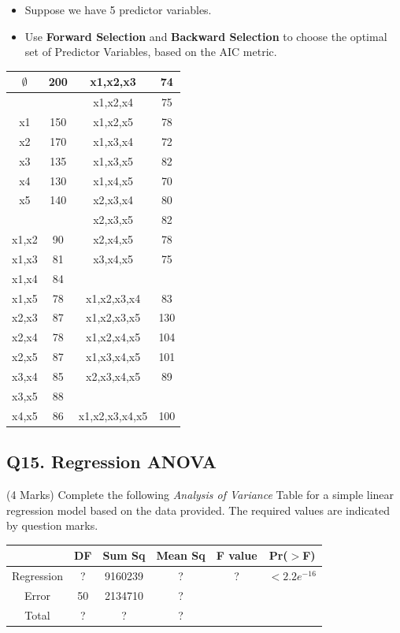 \documentclass[a4paper,12pt]{article}
\begin{document}
\begin{itemize}
\item Suppose we have 5 predictor variables.
\item Use \textbf{Forward Selection} and \textbf{Backward Selection} to choose the optimal set of Predictor Variables, based on the AIC metric.
\end{itemize}
{
	\large
	\begin{center}
\begin{tabular}{|c|c|c|c|}
	\hline
$\emptyset$	&	200	&	x1,x2,x3	&	74	\\ \hline
\phantom{makespace}
 &	\phantom{makespace}
 	&	x1,x2,x4	&	75	\\ \hline
x1	&	150	&	x1,x2,x5	&	78	\\ \hline
x2	&	170	&	x1,x3,x4	&	72	\\ \hline
x3	&	135	&	x1,x3,x5	&	82	\\ \hline
x4	&	130	&	x1,x4,x5	&	70	\\ \hline
x5	&	140	&	x2,x3,x4	&	80	\\ \hline
&		&	x2,x3,x5	&	82	\\ \hline
x1,x2	&	90	&	x2,x4,x5	&	78	\\ \hline
x1,x3	&	81	&	x3,x4,x5	&	75	\\ \hline
x1,x4	&	84	&	\phantom{makespace}
	&	\phantom{makespace}
		\\ \hline
x1,x5	&	78	&	x1,x2,x3,x4	&	83	\\ \hline
x2,x3	&	87	&	x1,x2,x3,x5	&	130	\\ \hline
x2,x4	&	78	&	x1,x2,x4,x5	&	104	\\ \hline
x2,x5	&	87	&	x1,x3,x4,x5	&	101	\\ \hline
x3,x4	&	85	&	x2,x3,x4,x5	&	89	\\ \hline
x3,x5	&	88	&		&		\\ \hline
x4,x5	&	86	&	x1,x2,x3,x4,x5	&	100	\\ \hline
		\end{tabular} 
	\end{center}
}
\newpage
\subsection*{Q15. Regression ANOVA}
(4 Marks) Complete the following \textit{Analysis of Variance} Table for a simple linear regression model based on the data provided. The required values are indicated by question marks.
\begin{center}
	\begin{tabular}{|c|c|c|c|c|c|} \hline
		& DF & 	Sum Sq &	Mean Sq &	F value &   	Pr($>$F)    \\ \hline
		Regression &  ? &	9160239 &	? &	 ? &	$< 2.2e^{-16}$ \\ \hline
		Error  & 50 &	2134710 &  	?   &            &       \\ \hline
		Total  & ?  &	? &  	?  &            &       \\ \hline
	\end{tabular} 
\end{center}
\end{document}
